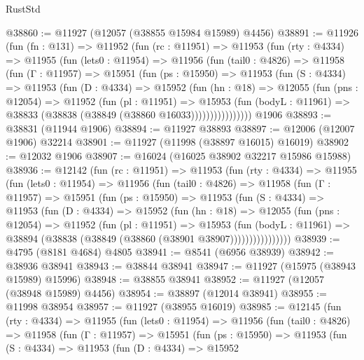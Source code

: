 \begin{lexlean}{RustStd}
\begin{coremodule}
@38860 := @11927 (@12057 (@38855 @15984 @15989) @4456)
@38891 := @11926
    (fun (fn : @131) =>
    @11952
      (fun (rc : @11951) =>
      @11953
        (fun (rty : @4334) =>
        @11955
          (fun (lets0 : @11954) =>
          @11956
            (fun (tail0 : @4826) =>
            @11958
              (fun (Γ : @11957) =>
              @15951
                (fun (ps : @15950) =>
                @11953
                  (fun (S : @4334) =>
                  @11953
                    (fun (D : @4334) =>
                    @15952
                      (fun (hn : @18) =>
                      @12055
                        (fun (pns : @12054) =>
                        @11952
                          (fun (pl : @11951) =>
                          @15953
                            (fun (bodyL : @11961) =>
                            @38833 (@38838 (@38849 (@38860 @16033))))))))))))))))
    @1906
@38893 := @38831 (@11944 @1906)
@38894 := @11927 @38893
@38897 := @12006 (@12007 @1906) @32214
@38901 := @11927 (@11998 (@38897 @16015) @16019)
@38902 := @12032 @1906
@38907 := @16024 (@16025 @38902 @32217 @15986 @15988)
@38936 := @12142
    (fun (rc : @11951) =>
    @11953
      (fun (rty : @4334) =>
      @11955
        (fun (lets0 : @11954) =>
        @11956
          (fun (tail0 : @4826) =>
          @11958
            (fun (Γ : @11957) =>
            @15951
              (fun (ps : @15950) =>
              @11953
                (fun (S : @4334) =>
                @11953
                  (fun (D : @4334) =>
                  @15952
                    (fun (hn : @18) =>
                    @12055
                      (fun (pns : @12054) =>
                      @11952
                        (fun (pl : @11951) =>
                        @15953
                          (fun (bodyL : @11961) =>
                          @38894 (@38838 (@38849 (@38860 (@38901 @38907))))))))))))))))
@38939 := @4795 (@8181 @4684) @4805
@38941 := @8541 (@6956 @38939)
@38942 := @38936 @38941
@38943 := @38844 @38941
@38947 := @11927 (@15975 (@38943 @15989) @15996)
@38948 := @38855 @38941
@38952 := @11927 (@12057 (@38948 @15989) @4456)
@38954 := @38897 (@12014 @38941)
@38955 := @11998 @38954
@38957 := @11927 (@38955 @16019)
@38985 := @12145
    (fun (rty : @4334) =>
    @11955
      (fun (lets0 : @11954) =>
      @11956
        (fun (tail0 : @4826) =>
        @11958
          (fun (Γ : @11957) =>
          @15951
            (fun (ps : @15950) =>
            @11953
              (fun (S : @4334) =>
              @11953
                (fun (D : @4334) =>
                @15952

\end{coremodule}
\end{lexlean}

